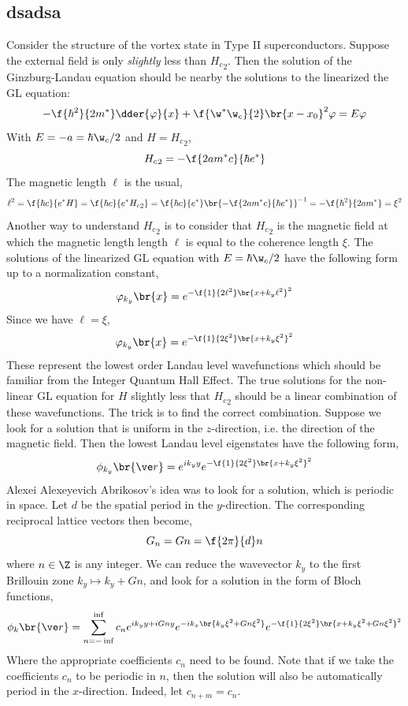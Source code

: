 \documentclass{article}
\newcommand{\vp}{\varphi}
\begin{document}
\subsection{dsadsa}

Consider the structure of the vortex state in Type II superconductors. Suppose the external field is only \textit{slightly} less than ${H_{c}}_2$. Then the solution of the Ginzburg-Landau equation should be nearby the solutions to the linearized the GL equation:
\[ - \f{\hbar^2}{2 m^*} \dder{\vp}{x} + \f{\w^{*} \w_{c}}{2} \br{x - x_0}^2 \vp = E \vp \]
With $E = - a = \hbar \w_c /2$ and $H = {H_{c}}_{2}$,
\[ {H_{c}}_2 = - \f{2am^{*}c}{\hbar e^{*}} \]
The magnetic length $\ell$ is the usual,
\[ \ell^2 = \f{\hbar c}{e^{*} H} = \f{\hbar c}{e^{*} {H_{c}}_{2}} = \f{\hbar c}{e^{*}}\br{- \f{2am^{*}c}{\hbar e^{*}}}^{-1} = -\f{\hbar^2}{2 a m^{*}} = \xi^2  \]
Another way to understand ${H_{c}}_2$ is to consider that ${H_{c}}_2$ is the magnetic field at which the magnetic length length $\ell$ is equal to the coherence length $\xi$. The solutions of the linearized GL equation with $E = \hbar \w_c / 2$ have the following form up to a normalization constant,
\[ \vp_{k_y}\br{x} = e^{-\f{1}{2\ell^2}\br{x + k_y \ell^2}^2} \]
Since we have $\ell = \xi$,
\[ \vp_{k_y}\br{x} = e^{-\f{1}{2\xi^2}\br{x + k_y \xi^2}^2} \]
These represent the lowest order Landau level wavefunctions which should be familiar from the Integer Quantum Hall Effect. The true solutions for the non-linear GL equation for $H$ slightly less that ${H_{c}}_2$ should be a linear combination of these wavefunctions. The trick is to find the correct combination. Suppose we look for a solution that is uniform in the $z$-direction, i.e. the direction of the magnetic field. Then the lowest Landau level eigenstates have the following form,
\[ \phi_{k_y}\br{\ve r} = e^{ik_y y}e^{-\f{1}{2\xi^2}\br{x + k_y \xi^2}^2} \]
Alexei Alexeyevich Abrikosov's idea was to look for a solution, which is periodic in space. Let $d$ be the spatial period in the $y$-direction. The corresponding reciprocal lattice vectors then become,
\[ G_{n} = Gn = \f{2\pi}{d}n \]
where $n \in \Z$ is any integer. We can reduce the wavevector $k_y$ to the first Brillouin zone $k_{y} \mapsto k_y + Gn$, and look for a solution in the form of Bloch functions,
\[ \phi_k\br{\ve r} = \sum_{n=-\inf}^{\inf} c_n e^{ik_y y + i Gn y}e^{-ik_x\br{k_y \xi^2 + G n \xi^2}} e^{-\f{1}{2 \xi^2} \br{x + k_y \xi^2 + G n \xi^2}^2} \]
Where the appropriate coefficients $c_n$ need to be found. Note that if we take the coefficients $c_n$ to be periodic in $n$, then the solution will also be automatically period in the $x$-direction. Indeed, let $c_{n+m} = c_n$.
\end{document}
